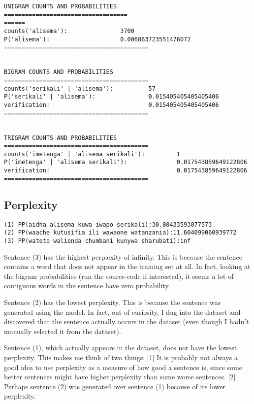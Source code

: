 \begin{center}
\begin{verbatim}
UNIGRAM COUNTS AND PROBABILITIES
===================================
======
counts('alisema'):               3700
P('alisema'):                    0.006863723551476072
=========================================


BIGRAM COUNTS AND PROBABILITIES
=========================================
counts('serikali' | 'alisema'):          57
P('serikali' | 'alisema'):               0.015405405405405406
verification:                            0.015405405405405406
=========================================


TRIGRAM COUNTS AND PROBABILITIES
=========================================
counts('imetenga' | 'alisema serikali'):         1
P('imetenga' | 'alisema serikali'):              0.017543859649122806
verification:                                    0.017543859649122806
=========================================
\end{verbatim}
\end{center}


\newpage
\subsection{Perplexity}

\begin{center}
\begin{verbatim}
(1) PP(aidha alisema kuwa iwapo serikali):30.80433593077573
(2) PP(waache kutusifia ili wawaone watanzania):11.604099060939772
(3) PP(watoto walienda chumbani kunywa sharubati):inf
\end{verbatim}
\end{center}

\begin{enumarabic}
  \item Sentence (3) has the highest perplexity of infinity.
    This is because the sentence contains a word that does not appear in the training set at all.
    In fact, looking at the bigram probabilities (run the source-code if interested),
    it seems a lot of contiguous words in the sentence have zero probability.

  \item Sentence (2) has the lowest perplexity.
    This is because the sentence was generated using the model.
    In fact, out of curiosity, I dug into the dataset and discovered that the sentence
    actually occurs in the dataset (even though I hadn't manually selected it
    from the dataset).
  \item Sentence (1), which actually appears in the dataset, does not have the lowest
    perplexity. This makes me think of two things:
    [1] It is probably not always a good idea to use perplexity
    as a measure of how good a sentence is, since some better sentences might
    have higher perplexity than some worse sentences.
    [2] Perhaps sentence (2) was generated over sentence (1) because of its lower perplexity.
\end{enumarabic}

